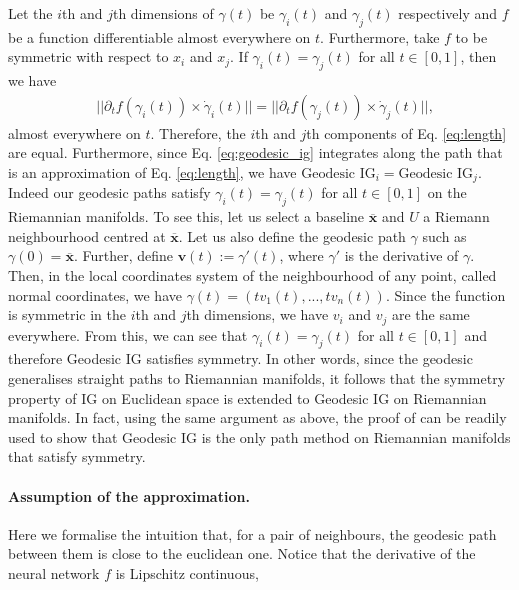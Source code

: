 Let the $i$th and $j$th dimensions of $\gamma(t)$ be $\gamma_i(t)$ and $\gamma_j(t)$ respectively and $f$ be a function differentiable almost everywhere on $t$. Furthermore, take $f$ to be symmetric with respect to $x_i$ and $x_j$. If $\gamma_i(t) = \gamma_j(t)$ for all $t \in [0,1]$, then we have 
\begin{equation}
\begin{split}
    & ||\partial_t f(\gamma_i(t)) \times \dot\gamma_i(t)|| = ||\partial_t f(\gamma_j(t)) \times \dot\gamma_j(t)||,
\end{split}
\label{eq:norms}
\end{equation}
almost everywhere on $t$. Therefore, the $i$th and $j$th components of Eq. \ref{eq:length} are equal. Furthermore, since  Eq. \ref{eq:geodesic_ig} integrates along the path that is an approximation of Eq. \ref{eq:length}, we have $\textrm{Geodesic IG}_i = \textrm{Geodesic IG}_j$. Indeed our geodesic paths satisfy  $\gamma_i(t) = \gamma_j(t)$ for all $t \in [0,1]$ on the Riemannian manifolds. To see this, let us select a baseline $\overline{\textbf{x}}$ and $U$ a Riemann neighbourhood centred at $\overline{\textbf{x}}$. Let us also define the geodesic path $\gamma$ such as $\gamma(0) = \overline{\textbf{x}}$. Further, define $\textbf{v}(t):=\gamma'(t)$, where $\gamma'$ is the derivative of $\gamma$. Then, in the local coordinates system of the neighbourhood of any point, called normal coordinates, we have $\gamma(t) = (tv_1(t), ..., tv_n(t))$. Since the function is symmetric in the $i$th and $j$th dimensions, we have $v_i$ and $v_j$ are the same everywhere. From this, we can see that $\gamma_i(t) = \gamma_j(t)$ for all $t \in [0,1]$ and therefore Geodesic IG satisfies symmetry. In other words, since the geodesic generalises straight paths to Riemannian manifolds, it follows that the symmetry property of IG on Euclidean space is extended to Geodesic IG on Riemannian manifolds. In fact, using the same argument as above, the proof of \citet[Theorem 1]{sundararajan2017axiomatic} can be readily used to show that Geodesic IG is the only path method on Riemannian manifolds that satisfy symmetry.

\paragraph{Assumption of the approximation.} 

Here we formalise the intuition that, for a pair of neighbours, the geodesic path between them is close to the euclidean one. Notice that the derivative of the neural network $f$ is Lipschitz continuous,


